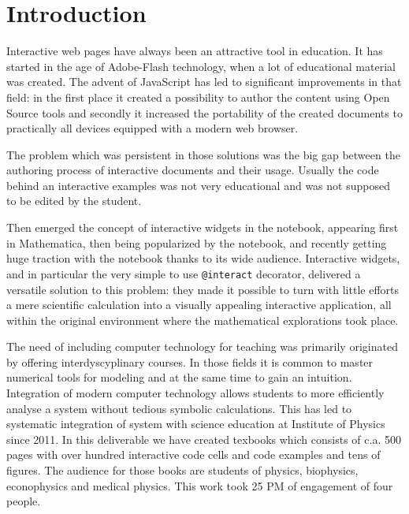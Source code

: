 \documentclass{deliverablereport}
\author{Marcin Kostur, Jerzy Łuczka, Jan Aksamit, Jolanta Marzec}
\begin{document}
\maketitle

\tableofcontents


\section{Introduction}

Interactive web pages have always been an attractive tool in
education. It has started in the age of Adobe-Flash technology, when a
lot of educational material was created. The advent of JavaScript has
led to significant improvements in that field: in the first place it
created a possibility to author the content using Open Source tools
and secondly it increased the portability of the created documents to
practically all devices equipped with a modern web browser.

The problem which was persistent in those solutions was the big gap
between the authoring process of interactive documents and their usage.
Usually the code behind an interactive examples was not very
educational and was not supposed to be edited by the student.

Then emerged the concept of interactive widgets in the notebook,
appearing first in Mathematica, then being popularized by the \Sage
notebook, and recently getting huge traction with the \Jupyter
notebook thanks to its wide audience. Interactive widgets, and in
particular the very simple to use \texttt{@interact} decorator,
delivered a versatile solution to this problem: they made it possible
to turn with little efforts a mere scientific calculation into a
visually appealing interactive application, all within the original
environment where the mathematical explorations took place.

The need of including computer technology for teaching was primarily
originated by offering interdyscyplinary courses. In those fields it
is common to master numerical tools for modeling and at the same time
to gain an intuition. Integration of modern computer technology allows
students to more efficiently analyse a system without tedious symbolic
calculations. This has led to systematic integration of \Sage system
with science education at Institute of Physics since 2011. In this
deliverable we have created texbooks which consists of c.a.  500 pages
with over hundred interactive code cells and code examples and tens of
figures. The audience for those books are students of physics,
biophysics, econophysics and medical physics. This work took 25
PM of engagement of four people. 
\end{document}
